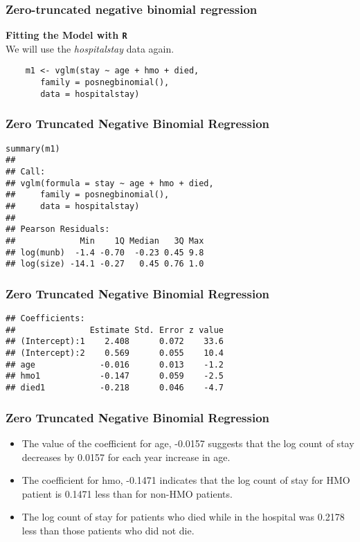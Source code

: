 \documentclass[MASTER.tex]{subfiles}
\begin{document}
\begin{frame}[fragile]
\frametitle{Zero-truncated negative binomial regression}
\large
\textbf{Fitting the Model with \texttt{R}}\\
We will use the \textit{hospitalstay} data again.
\begin{framed}
\begin{verbatim}
	m1 <- vglm(stay ~ age + hmo + died, 
	   family = posnegbinomial(), 
	   data = hospitalstay)

\end{verbatim}
\end{framed}
\end{frame}
\begin{frame}[fragile]
\frametitle{Zero Truncated Negative Binomial Regression}
\begin{verbatim}
summary(m1)
## 
## Call:
## vglm(formula = stay ~ age + hmo + died, 
##     family = posnegbinomial(), 
##     data = hospitalstay)
## 
## Pearson Residuals:
##             Min    1Q Median   3Q Max
## log(munb)  -1.4 -0.70  -0.23 0.45 9.8
## log(size) -14.1 -0.27   0.45 0.76 1.0
\end{verbatim}
\end{frame}
\begin{frame}[fragile]
	\frametitle{Zero Truncated Negative Binomial Regression}
	\begin{verbatim}
## Coefficients:
##               Estimate Std. Error z value
## (Intercept):1    2.408      0.072    33.6
## (Intercept):2    0.569      0.055    10.4
## age             -0.016      0.013    -1.2
## hmo1            -0.147      0.059    -2.5
## died1           -0.218      0.046    -4.7
\end{verbatim}
\end{frame}
\begin{frame}
	\frametitle{Zero Truncated Negative Binomial Regression}
\begin{itemize}
\item The value of the coefficient for age, -0.0157 suggests that the log count of stay decreases by 0.0157 for each year increase in age.
\item The coefficient for hmo, -0.1471 indicates that the log count of stay for HMO patient is 0.1471 less than for non-HMO patients.
\item The log count of stay for patients who died while in the hospital was 0.2178 less than those patients who did not die.
\end{itemize}

\end{frame}
\end{document}
